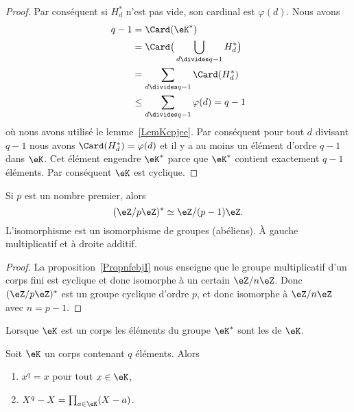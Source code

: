 \begin{proof}
	Par conséquent si \( H^*_d\) n'est pas vide, son cardinal est \( \varphi(d)\). Nous avons
	\begin{subequations}
		\begin{align}
			q-1 & =   \Card(\eK^*)                                  \\
			    & =   \Card\big( \bigcup_{d\divides q-1}H^*_d \big) \\
			    & =   \sum_{d\divides q-1}\Card(H^*_d)              \\
			    & \leq  \sum_{d\divides q-1}\varphi(d)
			=   q-1
		\end{align}
	\end{subequations}
	où nous avons utilisé le lemme~\ref{LemKcpjee}. Par conséquent pour tout \( d\) divisant \( q-1\) nous avons \( \Card(H^*_d)=\varphi(d)\) et il y a au moins un élément d'ordre \( q-1\) dans \( \eK\). Cet élément engendre \( \eK^*\) parce que \( \eK^*\) contient exactement \( q-1\) éléments. Par conséquent \( \eK\) est cyclique.
\end{proof}

\begin{corollary}   \label{CorpRUndR}
	Si \( p\) est un nombre premier, alors
	\begin{equation}
		(\eZ/p\eZ)^*\simeq\eZ/(p-1)\eZ.
	\end{equation}
	L'isomorphisme est un isomorphisme de groupes (abéliens). À gauche multiplicatif et à droite additif.
\end{corollary}

\begin{proof}
	La proposition~\ref{PropnfebjI} nous enseigne que le groupe multiplicatif d'un corps fini est cyclique et donc isomorphe à un certain \( \eZ/n\eZ\). Donc \( (\eZ/p\eZ)^*\) est un groupe cyclique d'ordre \( p\), et donc isomorphe à \( \eZ/n\eZ\) avec \( n=p-1\).
\end{proof}

Lorsque \( \eK\) est un corps les éléments du groupe \( \eK^*\) sont les  de \( \eK\).
\begin{proposition}     \label{propQRcUlq}
	Soit \( \eK\) un corps contenant \( q\) éléments. Alors
	\begin{enumerate}
		\item
		      \( x^q=x\) pour tout \( x\in \eK\),
		\item
		      \( X^q-X=\prod_{a\in \eK}(X-a)\).
	\end{enumerate}
\end{proposition}

